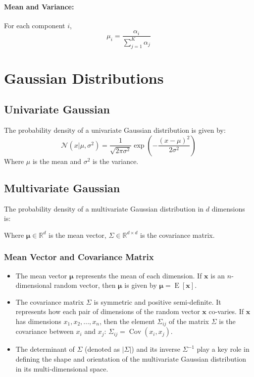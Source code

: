 \documentclass[8pt, a4paper, landscape, includeheadfoot]{extarticle}
\begin{document}
\begin{multicols*}{4}
	\paragraph{Mean and Variance:}
	For each component $i$,
	$$
		\mu_i = \frac{\alpha_i}{\sum_{j=1}^K \alpha_j}
	$$


	\section{Gaussian Distributions}
	\subsection{Univariate Gaussian}
	The probability density of a univariate Gaussian distribution is given by:
	$$
		\mathcal{N}(x | \mu, \sigma^2) = \frac{1}{\sqrt{2\pi \sigma^2}} \exp\left( -\frac{(x-\mu)^2}{2\sigma^2} \right)
	$$
	Where $\mu$ is the mean and $\sigma^2$ is the variance.

	\subsection{Multivariate Gaussian}
	The probability density of a multivariate Gaussian distribution in $d$ dimensions is:

	\vskip5pt

	\vskip5pt

	Where $\boldsymbol{\mu}\in\mathbb{R}^d$ is the mean vector, $\Sigma\in\mathbb{R}^{d\times d}$ is the covariance matrix.

	\subsubsection{Mean Vector and Covariance Matrix}{}
	\begin{itemize}
		\item The mean vector \(\boldsymbol{\mu}\) represents the mean of each dimension. If \(\mathbf{x}\) is an \(n\)-dimensional random vector, then \(\boldsymbol{\mu}\) is given by \(\boldsymbol{\mu} = \operatorname{E}[\mathbf{x}]\).
		\item The covariance matrix \(\Sigma\) is symmetric and positive semi-definite. It represents how each pair of dimensions of the random vector \(\mathbf{x}\) co-varies. If \(\mathbf{x}\) has dimensions \(x_1, x_2, ..., x_n\), then the element \(\Sigma_{ij}\) of the matrix \(\Sigma\) is the covariance between \(x_i\) and \(x_j\): \(\Sigma_{ij} = \operatorname{Cov}(x_i, x_j)\).
		\item The determinant of \(\Sigma\) (denoted as \(|\Sigma|\)) and its inverse \(\Sigma^{-1}\) play a key role in defining the shape and orientation of the multivariate Gaussian distribution in its multi-dimensional space.
	\end{itemize}


\end{multicols*}
\end{document}

